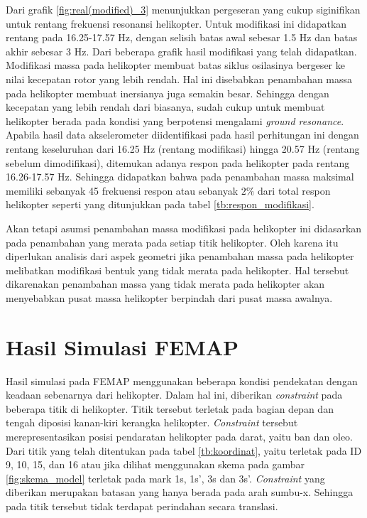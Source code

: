 Dari grafik \ref{fig:real(modified)_3} menunjukkan pergeseran yang cukup siginifikan untuk rentang frekuensi resonansi helikopter. Untuk modifikasi ini didapatkan rentang pada 16.25-17.57 Hz, dengan selisih batas awal sebesar 1.5 Hz dan batas akhir sebesar 3 Hz. Dari beberapa grafik hasil modifikasi yang telah didapatkan. Modifikasi massa pada helikopter membuat batas siklus osilasinya bergeser ke nilai kecepatan rotor yang lebih rendah. Hal ini disebabkan penambahan massa pada helikopter membuat inersianya juga semakin besar. Sehingga dengan kecepatan yang lebih rendah dari biasanya, sudah cukup untuk membuat helikopter berada pada kondisi yang berpotensi mengalami \textit{ground resonance}. Apabila hasil data akselerometer diidentifikasi pada hasil perhitungan ini dengan rentang keseluruhan dari 16.25 Hz (rentang modifikasi) hingga 20.57 Hz (rentang sebelum dimodifikasi), ditemukan adanya respon pada helikopter pada rentang 16.26-17.57 Hz. Sehingga didapatkan bahwa pada penambahan massa maksimal memiliki sebanyak 45 frekuensi respon atau sebanyak $2\%$ dari total respon helikopter seperti yang ditunjukkan pada tabel \ref{tb:respon_modifikasi}.

Akan tetapi asumsi penambahan massa modifikasi pada helikopter ini didasarkan pada penambahan yang merata pada setiap titik helikopter. Oleh karena itu diperlukan analisis dari aspek geometri jika penambahan massa pada helikopter melibatkan modifikasi bentuk yang tidak merata pada helikopter. Hal tersebut dikarenakan penambahan massa yang tidak merata pada helikopter akan menyebabkan pusat massa helikopter berpindah dari pusat massa awalnya. 


\section{Hasil Simulasi FEMAP}

Hasil simulasi pada FEMAP menggunakan beberapa kondisi pendekatan dengan keadaan sebenarnya dari helikopter. Dalam hal ini, diberikan \textit{constraint} pada beberapa titik di helikopter. Titik tersebut terletak pada bagian depan dan tengah diposisi kanan-kiri kerangka helikopter. \textit{Constraint} tersebut merepresentasikan posisi pendaratan helikopter pada darat, yaitu ban dan oleo. Dari titik yang telah ditentukan pada tabel \ref{tb:koordinat}, yaitu terletak pada ID 9, 10, 15, dan 16 atau jika dilihat menggunakan skema pada gambar \ref{fig:skema_model} terletak pada mark 1s, 1s', 3s dan 3s'. \textit{Constraint} yang diberikan merupakan batasan yang hanya berada pada arah sumbu-x. Sehingga pada titik tersebut tidak terdapat perindahan secara translasi.

